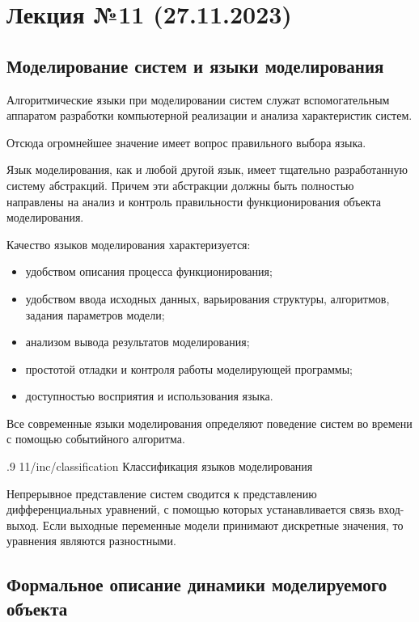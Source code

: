 \section{Лекция №11 (27.11.2023)}

\subsection{Моделирование систем и языки моделирования}

Алгоритмические языки при моделировании систем служат вспомогательным аппаратом разработки компьютерной реализации и анализа характеристик систем.

Отсюда огромнейшее значение имеет вопрос правильного выбора языка.

Язык моделирования, как и любой другой язык, имеет тщательно разработанную систему абстракций. Причем эти абстракции должны быть полностью направлены на анализ и контроль правильности функционирования объекта моделирования.

Качество языков моделирования характеризуется:

\begin{itemize}
    \item удобством описания процесса функционирования;
    \item удобством ввода исходных данных, варьирования структуры, алгоритмов, задания параметров модели;
    \item анализом вывода результатов моделирования;
    \item простотой отладки и контроля работы моделирующей программы;
    \item доступностью восприятия и использования языка.
\end{itemize}

Все современные языки моделирования определяют поведение систем во времени с помощью событийного алгоритма.

\image
{.9\textwidth}
{11/inc/classification}
{Классификация языков моделирования}

Непрерывное представление систем сводится к представлению дифференциальных уравнений, с помощью которых устанавливается связь вход-выход. Если выходные переменные модели принимают дискретные значения, то уравнения являются разностными.

\subsection{Формальное описание динамики моделируемого объекта}

